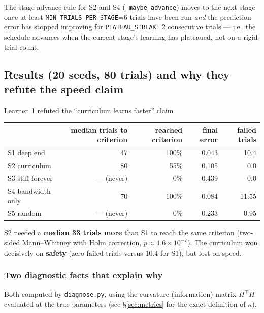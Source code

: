 \documentclass[11pt,a4paper]{article}
\begin{document}
The stage-advance rule for S2 and S4 (\texttt{\_maybe\_advance}) moves to the
next stage once at least \texttt{MIN\_TRIALS\_PER\_STAGE}=6 trials have been
run \emph{and} the prediction error has stopped improving for
\texttt{PLATEAU\_STREAK}=2 consecutive trials --- i.e.\ the schedule advances
when the current stage's learning has plateaued, not on a rigid trial count.

\subsection{Results (20 seeds, 80 trials) and why they refute the speed claim}
\label{sec:learner1results}

\begin{warnbox}{Learner~1 refuted the ``curriculum learns faster'' claim}
\begin{center}
\begin{tabular}{@{}lrrrr@{}}
\toprule
 & median trials to criterion & reached criterion & final error & failed trials \\
\midrule
S1 deep end & 47 & 100\% & 0.043 & 10.4 \\
S2 curriculum & 80 & 55\% & 0.105 & 0.0 \\
S3 stiff forever & --- (never) & 0\% & 0.439 & 0.0 \\
S4 bandwidth only & 70 & 100\% & 0.084 & 11.55 \\
S5 random & --- (never) & 0\% & 0.233 & 0.95 \\
\bottomrule
\end{tabular}
\end{center}
S2 needed a \textbf{median 33 trials more} than S1 to reach the same criterion
(two-sided Mann--Whitney with Holm correction, $p\approx1.6\times10^{-7}$).
The curriculum won decisively on \textbf{safety} (zero failed trials versus
10.4 for S1), but lost on speed.
\end{warnbox}

\subsubsection{Two diagnostic facts that explain why}
\label{sec:diag}

Both computed by \texttt{diagnose.py}, using the curvature (information)
matrix $H^\top H$ evaluated at the true parameters (see \S\ref{sec:metrics}
for the exact definition of $\kappa$).
\end{document}

